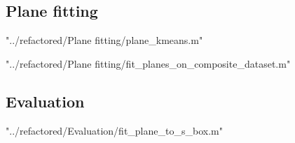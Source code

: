\documentclass[12pt,a4paper,onecolumn]{article}
\begin{document}
\subsection{Plane fitting}

{"../refactored/Plane fitting/plane_kmeans.m"}

{"../refactored/Plane fitting/fit_planes_on_composite_dataset.m"}

\subsection{Evaluation}

{"../refactored/Evaluation/fit_plane_to_s_box.m"}
\end{document}
